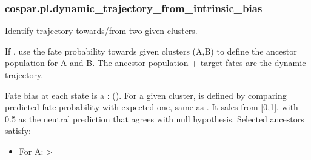 \documentclass[letterpaper,10pt,english]{sphinxmanual}
\begin{document}
\subsubsection{cospar.pl.dynamic\_trajectory\_from\_intrinsic\_bias}
\label{\detokenize{cospar.pl.dynamic_trajectory_from_intrinsic_bias:cospar-pl-dynamic-trajectory-from-intrinsic-bias}}\label{\detokenize{cospar.pl.dynamic_trajectory_from_intrinsic_bias::doc}}

\begin{fulllineitems}
\label{\detokenize{cospar.pl.dynamic_trajectory_from_intrinsic_bias:cospar.pl.dynamic_trajectory_from_intrinsic_bias}}
Identify trajectory towards/from two given clusters.

If , use the fate probability towards given clusters (A,B)
to define the ancestor population for A and B. The ancestor population + target fates
are the dynamic trajectory.

Fate bias at each state is a : ().
For a given cluster, is defined by comparing predicted fate probability with
expected one, same as {\hyperref[\detokenize{cospar.pl.fate_map:cospar.pl.fate_map}]{}}. It sales from {[}0,1{]}, with 0.5 as the
neutral prediction that agrees with null hypothesis. Selected ancestors satisfy:
\begin{itemize}
\item {} 
For A:  \textgreater{} 


\end{itemize}
\end{fulllineitems}
\end{document}
